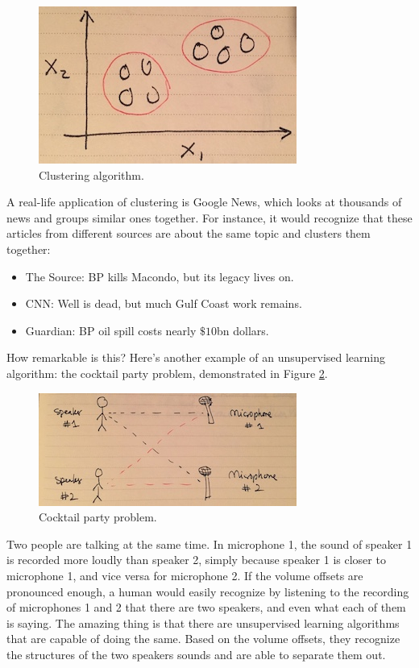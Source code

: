 \documentclass{article}
\theoremstyle{definition}
\begin{document}
\begin{figure}[ht]
\centering
\includegraphics[scale=0.8]{images/intro/clustering.jpg}
\caption{Clustering algorithm.}
\label{intro-clustering}
\end{figure}

A real-life application of clustering is Google News, which looks at thousands of news and groups similar ones together. For instance, it would recognize that these articles from different sources are about the same topic and clusters them together:

\begin{itemize}
    \item The Source: BP kills Macondo, but its legacy lives on.
    \item CNN: Well is dead, but much Gulf Coast work remains.
    \item Guardian: BP oil spill costs nearly $\$10$bn dollars.
\end{itemize}

How remarkable is this? Here's another example of an unsupervised learning algorithm: the cocktail party problem, demonstrated in Figure \ref{intro-cocktail}.

\begin{figure}[ht]
\centering
\includegraphics[scale=0.8]{images/intro/cocktail.jpg}
\caption{Cocktail party problem.}
\label{intro-cocktail}
\end{figure}

Two people are talking at the same time. In microphone 1, the sound of speaker 1 is recorded more loudly than speaker 2, simply because speaker 1 is closer to microphone 1, and vice versa for microphone 2. If the volume offsets are pronounced enough, a human would easily recognize by listening to the recording of microphones 1 and 2 that there are two speakers, and even what each of them is saying. The amazing thing is that there are unsupervised learning algorithms that are capable of doing the same. Based on the volume offsets, they recognize the structures of the two speakers sounds and are able to separate them out.
\end{document}
